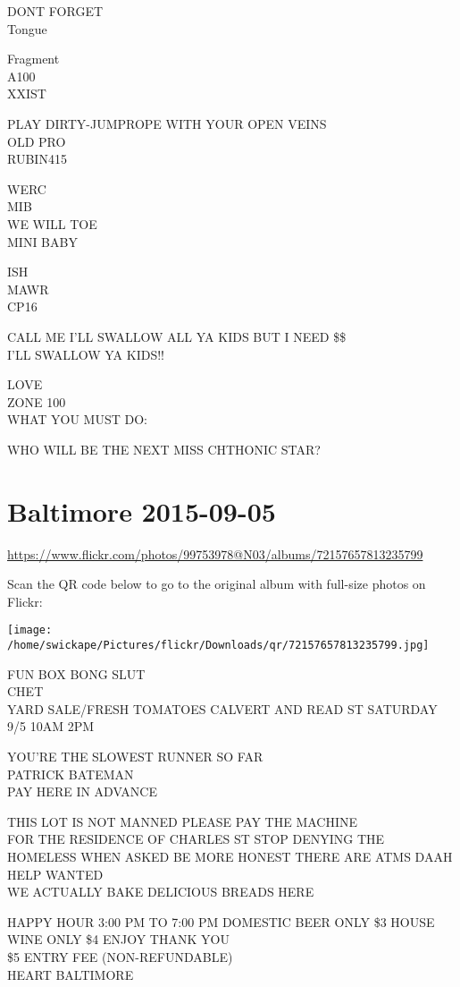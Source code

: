 \documentclass[10pt,letterpaper]{article}
\begin{document}
DONT FORGET\\
Tongue

Fragment\\
A100\\
XXIST

PLAY DIRTY{-}JUMPROPE WITH YOUR OPEN VEINS\\
OLD PRO\\
RUBIN415

WERC\\
MIB\\
WE WILL TOE\\
MINI BABY

ISH\\
MAWR\\
CP16

CALL ME I'LL SWALLOW ALL YA KIDS BUT I NEED \$\$\\
I'LL SWALLOW YA KIDS!!

LOVE\\
ZONE 100\\
WHAT YOU MUST DO:

WHO WILL BE THE NEXT MISS CHTHONIC STAR?


\section*{Baltimore 2015-09-05}

\url{https://www.flickr.com/photos/99753978@N03/albums/72157657813235799}

Scan the QR code below to go to the original album with full-size photos on Flickr:

\texttt{[image: /home/swickape/Pictures/flickr/Downloads/qr/72157657813235799.jpg]}


FUN BOX BONG SLUT\\
CHET\\
YARD SALE/FRESH TOMATOES CALVERT AND READ ST SATURDAY 9/5 10AM 2PM

YOU'RE THE SLOWEST RUNNER SO FAR\\
PATRICK BATEMAN\\
PAY HERE IN ADVANCE

THIS LOT IS NOT MANNED PLEASE PAY THE MACHINE\\
FOR THE RESIDENCE OF CHARLES ST STOP DENYING THE HOMELESS WHEN ASKED BE MORE HONEST THERE ARE ATMS DAAH\\
HELP WANTED\\
WE ACTUALLY BAKE DELICIOUS BREADS HERE

HAPPY HOUR 3:00 PM TO 7:00 PM DOMESTIC BEER ONLY \$3 HOUSE WINE ONLY \$4 ENJOY THANK YOU\\
\$5 ENTRY FEE (NON{-}REFUNDABLE)\\
HEART BALTIMORE
\end{document}
